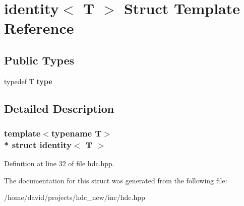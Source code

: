 \hypertarget{a00009}{}\section{identity$<$ T $>$ Struct Template Reference}
\label{a00009}
\subsection*{Public Types}
\begin{DoxyCompactItemize}
\item 
typedef T {\bfseries type}\hypertarget{a00009_af1d3cc50c66b9e147900b63d85cdd841}{}\label{a00009_af1d3cc50c66b9e147900b63d85cdd841}

\end{DoxyCompactItemize}


\subsection{Detailed Description}
\subsubsection*{template$<$typename T$>$\\*
struct identity$<$ T $>$}



Definition at line 32 of file hdc.\+hpp.



The documentation for this struct was generated from the following file\+:\begin{DoxyCompactItemize}
\item 
/home/david/projects/hdc\+\_\+new/inc/hdc.\+hpp\end{DoxyCompactItemize}
